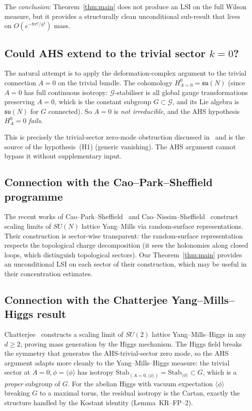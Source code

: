 \documentclass[11pt,a4paper]{amsart}
\theoremstyle{definition}
\newcommand{\su}{\mathfrak{su}}
\begin{document}
The \emph{conclusion}: Theorem~\ref{thm:main} does not produce an
LSI on the full Wilson measure, but it provides a structurally clean
unconditional sub-result that lives on $O(e^{-8\pi^2/g^2})$ mass.

\subsection{Could AHS extend to the trivial sector $k=0$?}
The natural attempt is to apply the deformation-complex argument to
the trivial connection $A=0$ on the trivial bundle. The cohomology
$H^0_{A=0} = \su(N)$ (since $A=0$ has full continuous isotropy:
$\mathcal G$-stabiliser is all global gauge transformations preserving
$A=0$, which is the constant subgroup $G\subset\mathcal G$, and its
Lie algebra is $\su(N)$ for $G$ connected). So $A=0$ is
\emph{not irreducible}, and the AHS hypothesis $H^0_A = 0$ \emph{fails}.

This is precisely the trivial-sector zero-mode obstruction
discussed in~\cite[\S 5]{RemondiereKRFP3_2026} and is the source of the
hypothesis~(H1) (generic vanishing). The AHS argument cannot bypass it
without supplementary input.

\subsection{Connection with the Cao--Park--Sheffield programme}
The recent works of Cao--Park--Sheffield~\cite{CaoParkSheffield2024}
and Cao--Nissim--Sheffield~\cite{CaoNissimSheffield2025} construct
scaling limits of $SU(N)$ lattice Yang--Mills via random-surface
representations. Their construction is sector-wise transparent: the
random-surface representation respects the topological charge
decomposition (it sees the holonomies along closed loops, which
distinguish topological sectors). Our Theorem~\ref{thm:main} provides
an unconditional LSI on each sector of their construction, which may
be useful in their concentration estimates.

\subsection{Connection with the Chatterjee Yang--Mills--Higgs result}
Chatterjee~\cite{Chatterjee2024} constructs a scaling limit of $SU(2)$
lattice Yang--Mills--Higgs in any $d\geq 2$, proving mass generation
by the Higgs mechanism. The Higgs field breaks the symmetry that
generates the AHS-trivial-sector zero mode, so the AHS argument adapts
more cleanly to the Yang--Mills--Higgs measure: the trivial
sector at $A=0,\phi = \langle\phi\rangle$ has isotropy
$\mathrm{Stab}_{(A=0,\langle\phi\rangle)} = \mathrm{Stab}_{\langle\phi\rangle}
\subset G$, which is a \emph{proper} subgroup of $G$. For the
abelian Higgs with vacuum expectation $\langle\phi\rangle$ breaking $G$
to a maximal torus, the residual isotropy is the Cartan,
exactly the structure handled by the Kostant identity (Lemma~KR--FP--2).
\end{document}
